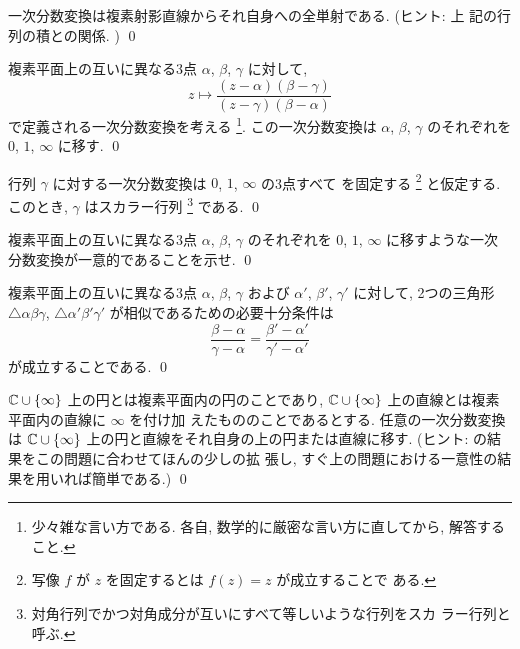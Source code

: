 \documentclass[12pt,twoside]{jarticle}
\begin{document}
\begin{question}
  一次分数変換は複素射影直線からそれ自身への全単射である. (ヒント: 上
  記の行列の積との関係. ) \qed
\end{question}


\begin{question}
  複素平面上の互いに異なる3点 $\alpha$, $\beta$, $\gamma$ に対して, 
  \[
    z \mapsto
    \frac{(z - \alpha)(\beta - \gamma)}{(z - \gamma)(\beta - \alpha)}
  \]
  で定義される一次分数変換を考える%
%
\footnote{少々雑な言い方である. 各自, 数学的に厳密な言い方に直してから, 
  解答すること. }. %
%
この一次分数変換は $\alpha$, $\beta$, $\gamma$ のそれぞれを $0$, $1$,
$\infty$ に移す.  \qed
\end{question}

\begin{question}
  行列 $\gamma$ に対する一次分数変換は $0$, $1$, $\infty$ の3点すべて
  を固定する%
  \footnote{写像 $f$ が $z$ を固定するとは $f(z)=z$ が成立することで
    ある.}%
  と仮定する. このとき, $\gamma$ はスカラー行列%
  \footnote{対角行列でかつ対角成分が互いにすべて等しいような行列をスカ
    ラー行列と呼ぶ. }%
  である. \qed
\end{question}

\begin{question}
  複素平面上の互いに異なる3点 $\alpha$, $\beta$, $\gamma$ のそれぞれを 
  $0$, $1$, $\infty$ に移すような一次分数変換が一意的であることを示せ. 
  \qed
\end{question}


%
\begin{question}
  複素平面上の互いに異なる3点 $\alpha$, $\beta$, $\gamma$ および 
  $\alpha'$, $\beta'$, $\gamma'$ に対して, 2つの三角形 
  $\bigtriangleup\alpha\beta\gamma$, 
  $\bigtriangleup\alpha'\beta'\gamma'$ 
  が相似であるための必要十分条件は 
  \[
    \frac{\beta - \alpha}{\gamma - \alpha} 
    =
    \frac{\beta' - \alpha'}{\gamma' - \alpha'} 
  \]%
  が成立することである. \qed
\end{question}

\begin{question}
  ${\mathbb C}\cup\{\infty\}$ 上の円とは複素平面内の円のことであり,
  ${\mathbb C}\cup\{\infty\}$ 上の直線とは複素平面内の直線に $\infty$ を付け加
  えたもののことであるとする. 任意の一次分数変換は ${\mathbb C}\cup\{\infty\}$
  上の円と直線をそれ自身の上の円または直線に移す. (ヒント:
   の結果をこの問題に合わせてほんの少しの拡
  張し, すぐ上の問題における一意性の結果を用いれば簡単である.)
  \qed
\end{question}
\end{document}
